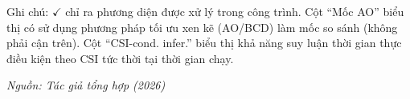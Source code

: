 \begin{table}[t]
\vspace{0.2em}
{\footnotesize Ghi chú: $\checkmark$ chỉ ra phương diện được xử lý trong công trình. Cột ``Mốc AO'' biểu thị có sử dụng phương pháp tối ưu xen kẽ (AO/BCD) làm mốc so sánh (không phải cận trên). Cột ``CSI-cond. infer.'' biểu thị khả năng suy luận thời gian thực điều kiện theo CSI tức thời tại thời gian chạy.\par}
\hfill {\footnotesize\itshape Nguồn: Tác giả tổng hợp (2026)}
\end{table}
